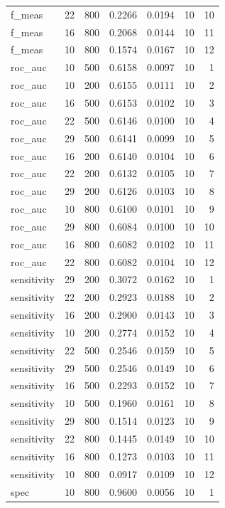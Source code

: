 \documentclass[
  11pt,
  a4paper,
]{article}
\begin{document}
\begin{longtable}[t]{>{\raggedleft\arraybackslash}p{2.4cm}rrrrrr}
f\_meas & 22 & 800 & 0.2266 & 0.0194 & 10 & 10\\
f\_meas & 16 & 800 & 0.2068 & 0.0144 & 10 & 11\\
f\_meas & 10 & 800 & 0.1574 & 0.0167 & 10 & 12\\
roc\_auc & 10 & 500 & 0.6158 & 0.0097 & 10 & 1\\
\addlinespace
roc\_auc & 10 & 200 & 0.6155 & 0.0111 & 10 & 2\\
roc\_auc & 16 & 500 & 0.6153 & 0.0102 & 10 & 3\\
roc\_auc & 22 & 500 & 0.6146 & 0.0100 & 10 & 4\\
roc\_auc & 29 & 500 & 0.6141 & 0.0099 & 10 & 5\\
roc\_auc & 16 & 200 & 0.6140 & 0.0104 & 10 & 6\\
\addlinespace
roc\_auc & 22 & 200 & 0.6132 & 0.0105 & 10 & 7\\
roc\_auc & 29 & 200 & 0.6126 & 0.0103 & 10 & 8\\
roc\_auc & 10 & 800 & 0.6100 & 0.0101 & 10 & 9\\
roc\_auc & 29 & 800 & 0.6084 & 0.0100 & 10 & 10\\
roc\_auc & 16 & 800 & 0.6082 & 0.0102 & 10 & 11\\
\addlinespace
roc\_auc & 22 & 800 & 0.6082 & 0.0104 & 10 & 12\\
sensitivity & 29 & 200 & 0.3072 & 0.0162 & 10 & 1\\
sensitivity & 22 & 200 & 0.2923 & 0.0188 & 10 & 2\\
sensitivity & 16 & 200 & 0.2900 & 0.0143 & 10 & 3\\
sensitivity & 10 & 200 & 0.2774 & 0.0152 & 10 & 4\\
\addlinespace
sensitivity & 22 & 500 & 0.2546 & 0.0159 & 10 & 5\\
sensitivity & 29 & 500 & 0.2546 & 0.0149 & 10 & 6\\
sensitivity & 16 & 500 & 0.2293 & 0.0152 & 10 & 7\\
sensitivity & 10 & 500 & 0.1960 & 0.0161 & 10 & 8\\
sensitivity & 29 & 800 & 0.1514 & 0.0123 & 10 & 9\\
\addlinespace
sensitivity & 22 & 800 & 0.1445 & 0.0149 & 10 & 10\\
sensitivity & 16 & 800 & 0.1273 & 0.0103 & 10 & 11\\
sensitivity & 10 & 800 & 0.0917 & 0.0109 & 10 & 12\\
spec & 10 & 800 & 0.9600 & 0.0056 & 10 & 1\\

\end{longtable}
\end{document}
